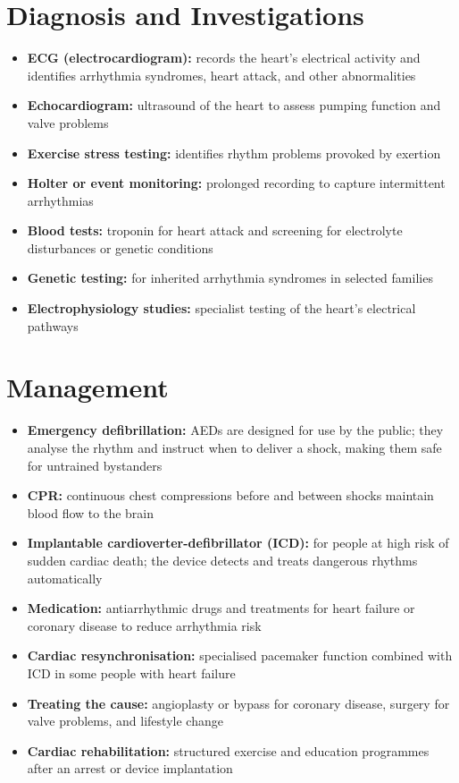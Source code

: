 \section*{Diagnosis and Investigations}
\begin{itemize}
    \item \textbf{ECG (electrocardiogram):} records the heart's electrical activity and identifies arrhythmia syndromes, heart attack, and other abnormalities
    \item \textbf{Echocardiogram:} ultrasound of the heart to assess pumping function and valve problems
    \item \textbf{Exercise stress testing:} identifies rhythm problems provoked by exertion
    \item \textbf{Holter or event monitoring:} prolonged recording to capture intermittent arrhythmias
    \item \textbf{Blood tests:} troponin for heart attack and screening for electrolyte disturbances or genetic conditions
    \item \textbf{Genetic testing:} for inherited arrhythmia syndromes in selected families
    \item \textbf{Electrophysiology studies:} specialist testing of the heart's electrical pathways
\end{itemize}

\section*{Management}
\begin{itemize}
    \item \textbf{Emergency defibrillation:} AEDs are designed for use by the public; they analyse the rhythm and instruct when to deliver a shock, making them safe for untrained bystanders
    \item \textbf{CPR:} continuous chest compressions before and between shocks maintain blood flow to the brain
    \item \textbf{Implantable cardioverter-defibrillator (ICD):} for people at high risk of sudden cardiac death; the device detects and treats dangerous rhythms automatically
    \item \textbf{Medication:} antiarrhythmic drugs and treatments for heart failure or coronary disease to reduce arrhythmia risk
    \item \textbf{Cardiac resynchronisation:} specialised pacemaker function combined with ICD in some people with heart failure
    \item \textbf{Treating the cause:} angioplasty or bypass for coronary disease, surgery for valve problems, and lifestyle change
    \item \textbf{Cardiac rehabilitation:} structured exercise and education programmes after an arrest or device implantation
\end{itemize}

